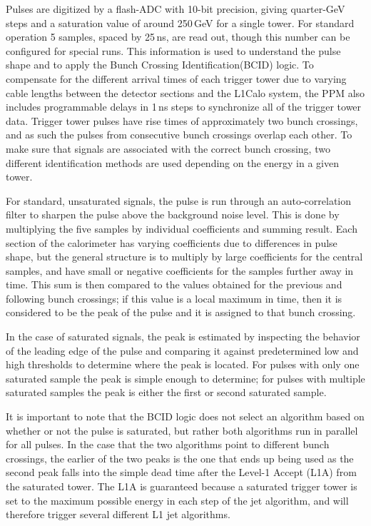 Pulses are digitized by a flash-ADC with 10-bit precision, giving quarter-GeV steps and a saturation value of around 250\,GeV for a single tower.  For standard operation 5 samples, spaced by 25\,ns, are read out, though this number can be configured for special runs.  This information is used to understand the pulse shape and to apply the Bunch Crossing Identification(BCID) logic.  To compensate for the different arrival times of each trigger tower due to varying cable lengths between the detector sections and the L1Calo system, the PPM also includes programmable delays in 1\,ns steps to synchronize all of the trigger tower data.  Trigger tower pulses have rise times of approximately two bunch crossings, and as such the pulses from consecutive bunch crossings overlap each other.  To make sure that signals are associated with the correct bunch crossing, two different identification methods are used depending on the energy in a given tower.

For standard, unsaturated signals, the pulse is run through an auto-correlation filter to sharpen the pulse above the background noise level.  This is done by multiplying the five samples by individual coefficients and summing result.  Each section of the calorimeter has varying coefficients due to differences in pulse shape, but the general structure is to multiply by large coefficients for the central samples, and have small or negative coefficients for the samples further away in time.  This sum is then compared to the values obtained for the previous and following bunch crossings; if this value is a local maximum in time, then it is considered to be the peak of the pulse and it is assigned to that bunch crossing.

In the case of saturated signals, the peak is estimated by inspecting the behavior of the leading edge of the pulse and comparing it against predetermined low and high thresholds to determine where the peak is located.  For pulses with only one saturated sample the peak is simple enough to determine; for pulses with multiple saturated samples the peak is either the first or second saturated sample.

It is important to note that the BCID logic does not select an algorithm based on whether or not the pulse is saturated, but rather both algorithms run in parallel for all pulses.  In the case that the two algorithms point to different bunch crossings, the earlier of the two peaks is the one that ends up being used as the second peak falls into the simple dead time after the Level-1 Accept (L1A) from the saturated tower.  The L1A is guaranteed because a saturated trigger tower is set to the maximum possible energy in each step of the jet algorithm, and will therefore trigger several different L1 jet algorithms.

